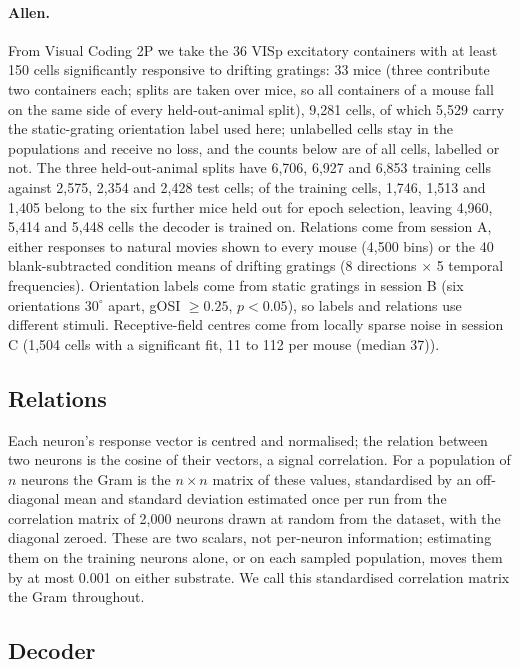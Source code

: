 \documentclass[11pt]{article}
\begin{document}
\paragraph{Allen.} From Visual Coding 2P \citep{devries2020} we take the 36 VISp excitatory containers with at least 150 cells significantly responsive to drifting gratings: 33 mice (three contribute two containers each; splits are taken over mice, so all containers of a mouse fall on the same side of every held-out-animal split), 9,281 cells, of which 5,529 carry the static-grating orientation label used here; unlabelled cells stay in the populations and receive no loss, and the counts below are of all cells, labelled or not. The three held-out-animal splits have 6,706, 6,927 and 6,853 training cells against 2,575, 2,354 and 2,428 test cells; of the training cells, 1,746, 1,513 and 1,405 belong to the six further mice held out for epoch selection, leaving 4,960, 5,414 and 5,448 cells the decoder is trained on. Relations come from session A, either responses to natural movies shown to every mouse (4,500 bins) or the 40 blank-subtracted condition means of drifting gratings (8 directions $\times$ 5 temporal frequencies). Orientation labels come from static gratings in session B (six orientations $30^\circ$ apart, gOSI $\geq 0.25$, $p < 0.05$), so labels and relations use different stimuli. Receptive-field centres come from locally sparse noise in session C (1,504 cells with a significant fit, 11 to 112 per mouse (median 37)).

\subsection{Relations}

Each neuron's response vector is centred and normalised; the relation between two neurons is the cosine of their vectors, a signal correlation. For a population of $n$ neurons the Gram is the $n\times n$ matrix of these values, standardised by an off-diagonal mean and standard deviation estimated once per run from the correlation matrix of 2,000 neurons drawn at random from the dataset, with the diagonal zeroed. These are two scalars, not per-neuron information; estimating them on the training neurons alone, or on each sampled population, moves them by at most 0.001 on either substrate. We call this standardised correlation matrix the Gram throughout.

\subsection{Decoder}
\end{document}
